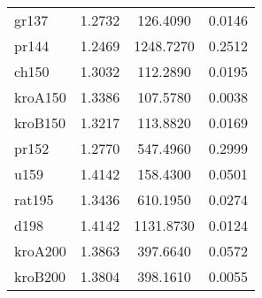 \begin{tabular}{|lccc|}
    gr137 & \num{1.2732} & \num{126.4090} & \num{0.0146} \\
    pr144 & \num{1.2469} & \num{1248.7270} & \num{0.2512} \\
    ch150 & \num{1.3032} & \num{112.2890} & \num{0.0195} \\
    kroA150 & \num{1.3386} & \num{107.5780} & \num{0.0038} \\
    kroB150 & \num{1.3217} & \num{113.8820} & \num{0.0169} \\
    pr152 & \num{1.2770} & \num{547.4960} & \num{0.2999} \\
    u159 & \num{1.4142} & \num{158.4300} & \num{0.0501} \\
    rat195 & \num{1.3436} & \num{610.1950} & \num{0.0274} \\
    d198 & \num{1.4142} & \num{1131.8730} & \num{0.0124} \\
    kroA200 & \num{1.3863} & \num{397.6640} & \num{0.0572} \\
    kroB200 & \num{1.3804} & \num{398.1610} & \num{0.0055} \\
    \hline
    \end{tabular}
